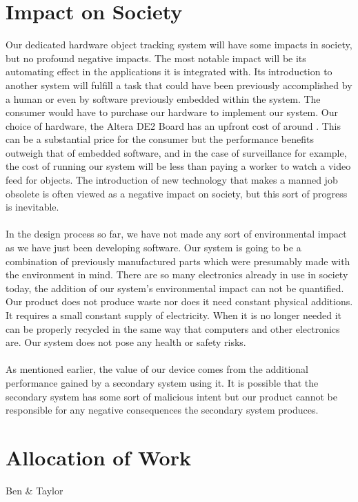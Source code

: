 \documentclass[12pt]{article} %
\begin{document}
\section{Impact on Society}
Our dedicated hardware object tracking system will have some impacts in society, but no profound negative impacts. The most notable impact will be its automating effect in the applications it is integrated with. Its introduction to another system will fulfill a task that could have been previously accomplished by a human or even by software previously embedded within the system. The consumer would have to purchase our hardware to implement our system. Our choice of hardware, the Altera DE2 Board has an upfront cost of around . This can be a substantial price for the consumer but the performance benefits outweigh that of embedded software, and in the case of surveillance for example, the cost of running our system will be less than paying a worker to watch a video feed for objects. The introduction of new technology that makes a manned job obsolete is often viewed as a negative impact on society, but this sort of progress is inevitable. \\\\
In the design process so far, we have not made any sort of environmental impact as we have just been developing software. Our system is going to be a combination of previously manufactured parts which were presumably made with the environment in mind. There are so many electronics already in use in society today, the addition of our system's environmental impact can not be quantified. Our product does not produce waste nor does it need constant physical additions. It requires a small constant supply of electricity. When it is no longer needed it can be properly recycled in the same way that computers and other electronics are. Our system does not pose any health or safety risks.\\\\
As mentioned earlier, the value of our device comes from the additional performance gained by a secondary system using it. It is possible that the secondary system has some sort of malicious intent but our product cannot be responsible for any negative consequences the secondary system produces. 

\section{Allocation of Work}
Ben \& Taylor
\end{document}
